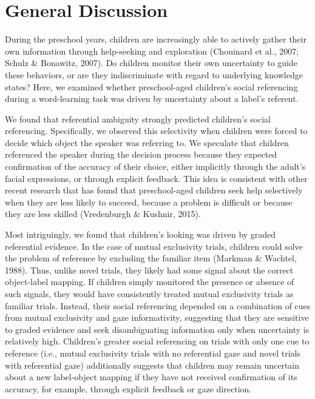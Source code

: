 \documentclass[10pt, letterpaper]{article}
\begin{document}
\section{General Discussion}\label{general-discussion}

During the preschool years, children are increasingly able to actively
gather their own information through help-seeking and exploration
(Chouinard et al., 2007; Schulz \& Bonawitz, 2007). Do children monitor
their own uncertainty to guide these behaviors, or are they
indiscriminate with regard to underlying knowledge states? Here, we
examined whether preschool-aged children's social referencing during a
word-learning task was driven by uncertainty about a label's referent.

We found that referential ambiguity strongly predicted children's social
referencing. Specifically, we observed this selectivity when children
were forced to decide which object the speaker was referring to. We
speculate that children referenced the speaker during the decision
process because they expected confirmation of the accuracy of their
choice, either implicitly through the adult's facial expressions, or
through explicit feedback. This idea is consistent with other recent
research that has found that preschool-aged children seek help
selectively when they are less likely to succeed, because a problem is
difficult or because they are less skilled (Vredenburgh \& Kushnir,
2015).

Most intriguingly, we found that children's looking was driven by graded
referential evidence. In the case of mutual exclusivity trials, children
could solve the problem of reference by excluding the familiar item
(Markman \& Wachtel, 1988). Thus, unlike novel trials, they likely had
some signal about the correct object-label mapping. If children simply
monitored the presence or absence of such signals, they would have
consistently treated mutual exclusivity trials as familiar trials.
Instead, their social referencing depended on a combination of cues from
mutual exclusivity and gaze informativity, suggesting that they are
sensitive to graded evidence and seek disambiguating information only
when uncertainty is relatively high. Children's greater social
referencing on trials with only one cue to reference (i.e., mutual
exclusivity trials with no referential gaze and novel trials with
referential gaze) additionally suggests that children may remain
uncertain about a new label-object mapping if they have not received
confirmation of its accuracy, for example, through explicit feedback or
gaze direction.
\end{document}
